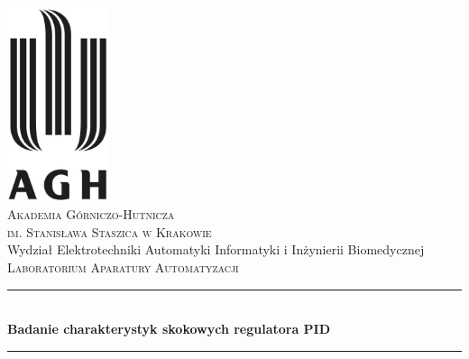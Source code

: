 \begin{titlepage}

\newcommand{\HRule}{\rule{\linewidth}{0.5mm}}

\center
 

\includegraphics[width=3cm]{../res/img/logo.jpg}\\[1cm]
 
 

\textsc{\LARGE Akademia Górniczo-Hutnicza \\[0.2cm]
im. Stanisława Staszica w Krakowie}\\[1.5cm]

\textrm{\Large Wydział Elektrotechniki Automatyki Informatyki i Inżynierii
Biomedycznej}\\[1cm]

\textsc{\Large Laboratorium Aparatury Automatyzacji}\\[0.5cm]


\HRule \\[0.4cm]
{ \huge \bfseries Badanie charakterystyk skokowych regulatora PID
}\\%
\HRule \\[1.5cm]


\end{titlepage}
